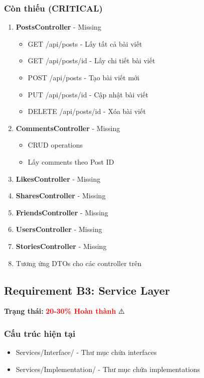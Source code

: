 \documentclass[12pt,a4paper]{report}
\begin{document}
\subsubsection{Còn thiếu (CRITICAL)}
\begin{enumerate}
    \item \textbf{PostsController} - Missing
    \begin{itemize}
        \item GET /api/posts - Lấy tất cả bài viết
        \item GET /api/posts/{id} - Lấy chi tiết bài viết
        \item POST /api/posts - Tạo bài viết mới
        \item PUT /api/posts/{id} - Cập nhật bài viết
        \item DELETE /api/posts/{id} - Xóa bài viết
    \end{itemize}
    
    \item \textbf{CommentsController} - Missing
    \begin{itemize}
        \item CRUD operations
        \item Lấy comments theo Post ID
    \end{itemize}
    
    \item \textbf{LikesController} - Missing
    \item \textbf{SharesController} - Missing
    \item \textbf{FriendsController} - Missing
    \item \textbf{UsersController} - Missing
    \item \textbf{StoriesController} - Missing
    
    \item Tương ứng DTOs cho các controller trên
\end{enumerate}

\newpage

\subsection{Requirement B3: Service Layer}
\textbf{Trạng thái: } \textcolor{red}{\textbf{20-30\% Hoàn thành}} ⚠️

\subsubsection{Cấu trúc hiện tại}
\begin{itemize}
    \item Services/Interface/ - Thư mục chứa interfaces
    \item Services/Implementation/ - Thư mục chứa implementations
\end{itemize}
\end{document}
